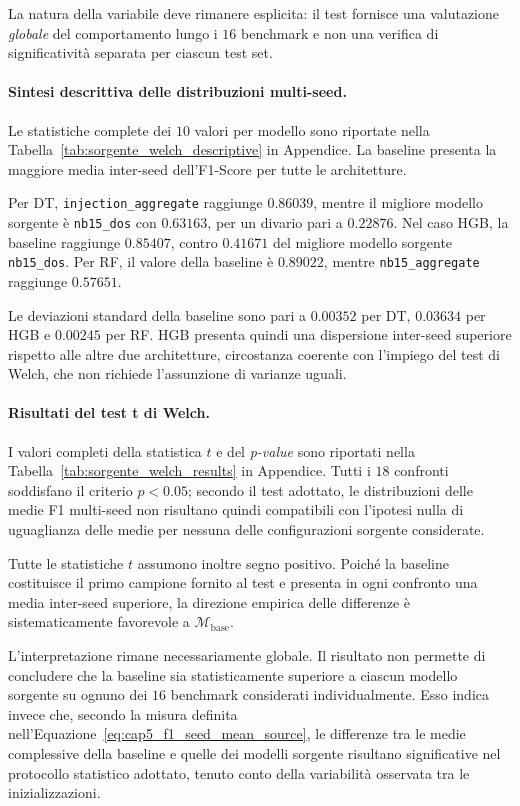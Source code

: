 La natura della variabile deve rimanere esplicita: il test fornisce una valutazione \emph{globale} del comportamento lungo i $16$ benchmark e non una verifica di significatività separata per ciascun test set.

\paragraph{Sintesi descrittiva delle distribuzioni multi-seed.}
Le statistiche complete dei $10$ valori per modello sono riportate nella Tabella~\ref{tab:sorgente_welch_descriptive} in Appendice. 
La baseline presenta la maggiore media inter-seed dell'F1-Score per tutte le architetture.

Per DT, \texttt{injection\_aggregate} raggiunge $0.86039$, mentre il migliore modello sorgente è \texttt{nb15\_dos} con $0.63163$, per un divario pari a $0.22876$. 
Nel caso HGB, la baseline raggiunge $0.85407$, contro $0.41671$ del migliore modello sorgente \texttt{nb15\_dos}. 
Per RF, il valore della baseline è $0.89022$, mentre \texttt{nb15\_aggregate} raggiunge $0.57651$.

Le deviazioni standard della baseline sono pari a $0.00352$ per DT, $0.03634$ per HGB e $0.00245$ per RF. 
HGB presenta quindi una dispersione inter-seed superiore rispetto alle altre due architetture, circostanza coerente con l'impiego del test di Welch, che non richiede l'assunzione di varianze uguali.

\paragraph{Risultati del test t di Welch.}
I valori completi della statistica $t$ e del \textit{p-value} sono riportati nella Tabella~\ref{tab:sorgente_welch_results} in Appendice. 
Tutti i $18$ confronti soddisfano il criterio $p<0.05$; secondo il test adottato, le distribuzioni delle medie F1 multi-seed non risultano quindi compatibili con l'ipotesi nulla di uguaglianza delle medie per nessuna delle configurazioni sorgente considerate.

Tutte le statistiche $t$ assumono inoltre segno positivo. 
Poiché la baseline costituisce il primo campione fornito al test e presenta in ogni confronto una media inter-seed superiore, la direzione empirica delle differenze è sistematicamente favorevole a $\mathcal{M}_{\mathrm{base}}$.

L'interpretazione rimane necessariamente globale. 
Il risultato non permette di concludere che la baseline sia statisticamente superiore a ciascun modello sorgente su ognuno dei $16$ benchmark considerati individualmente. 
Esso indica invece che, secondo la misura definita nell'Equazione~\eqref{eq:cap5_f1_seed_mean_source}, le differenze tra le medie complessive della baseline e quelle dei modelli sorgente risultano significative nel protocollo statistico adottato, tenuto conto della variabilità osservata tra le inizializzazioni.

